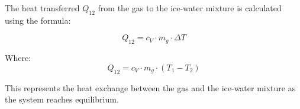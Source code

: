 The heat transferred \( Q_{12} \) from the gas to the ice-water mixture is calculated using the formula:  

\[
Q_{12} = c_V \cdot m_g \cdot \Delta T
\]

Where:  
\[
Q_{12} = c_V \cdot m_g \cdot (T_1 - T_2)
\]  

This represents the heat exchange between the gas and the ice-water mixture as the system reaches equilibrium.